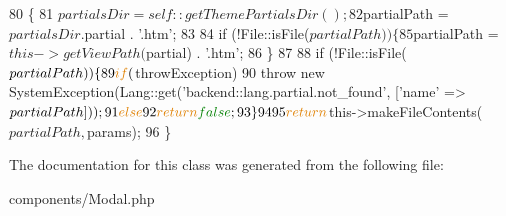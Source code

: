 \begin{DoxyCode}
80     \{   
81         $partialsDir = self::getThemePartialsDir();
82         $partialPath = $partialsDir . $partial . \textcolor{stringliteral}{'.htm'};
83 
84         \textcolor{keywordflow}{if} (!File::isFile($partialPath)) \{
85             $partialPath = $this->getViewPath($partial) . \textcolor{stringliteral}{'.htm'};
86         \}
87 
88         \textcolor{keywordflow}{if} (!File::isFile($partialPath)) \{
89             \textcolor{keywordflow}{if} ($throwException)
90                 \textcolor{keywordflow}{throw} \textcolor{keyword}{new} SystemException(Lang::get(\textcolor{stringliteral}{'backend::lang.partial.not\_found'}, [\textcolor{stringliteral}{'name'} => 
      $partialPath]));
91             \textcolor{keywordflow}{else}
92                 \textcolor{keywordflow}{return} \textcolor{keyword}{false};
93         \}   
94 
95         \textcolor{keywordflow}{return} $this->makeFileContents($partialPath, $params);
96     \}   
\end{DoxyCode}


The documentation for this class was generated from the following file\-:\begin{DoxyCompactItemize}
\item 
components/Modal.\-php\end{DoxyCompactItemize}
